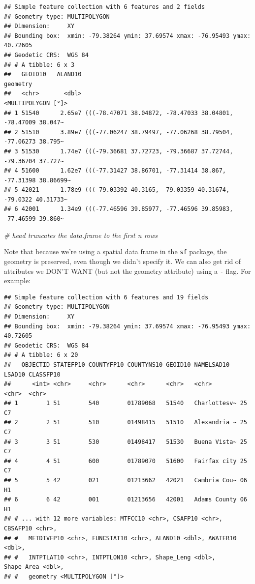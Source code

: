 \documentclass[]{article}
\newenvironment{Shaded}{\begin{snugshade}}{\end{snugshade}}
\newcommand{\CommentTok}[1]{\textcolor[rgb]{0.56,0.35,0.01}{\textit{#1}}}
\begin{document}
\begin{verbatim}
## Simple feature collection with 6 features and 2 fields
## Geometry type: MULTIPOLYGON
## Dimension:     XY
## Bounding box:  xmin: -79.38264 ymin: 37.69574 xmax: -76.95493 ymax: 40.72605
## Geodetic CRS:  WGS 84
## # A tibble: 6 x 3
##   GEOID10   ALAND10                                                     geometry
##   <chr>       <dbl>                                           <MULTIPOLYGON [°]>
## 1 51540      2.65e7 (((-78.47071 38.04872, -78.47033 38.04801, -78.47009 38.047~
## 2 51510      3.89e7 (((-77.06247 38.79497, -77.06268 38.79504, -77.06273 38.795~
## 3 51530      1.74e7 (((-79.36681 37.72723, -79.36687 37.72744, -79.36704 37.727~
## 4 51600      1.62e7 (((-77.31427 38.86701, -77.31414 38.867, -77.31398 38.86699~
## 5 42021      1.78e9 (((-79.03392 40.3165, -79.03359 40.31674, -79.0322 40.31733~
## 6 42001      1.34e9 (((-77.46596 39.85977, -77.46596 39.85983, -77.46599 39.860~
\end{verbatim}

\begin{Shaded}
\begin{Highlighting}[]
\CommentTok{\# head truncates the data.frame to the first n rows}
\end{Highlighting}
\end{Shaded}

Note that because we're using a spatial data frame in the \texttt{sf}
package, the geometry is preserved, even though we didn't specify it. We
can also get rid of attributes we DON'T WANT (but not the geometry
attribute) using a \texttt{-} flag. For example:

\begin{verbatim}
## Simple feature collection with 6 features and 19 fields
## Geometry type: MULTIPOLYGON
## Dimension:     XY
## Bounding box:  xmin: -79.38264 ymin: 37.69574 xmax: -76.95493 ymax: 40.72605
## Geodetic CRS:  WGS 84
## # A tibble: 6 x 20
##   OBJECTID STATEFP10 COUNTYFP10 COUNTYNS10 GEOID10 NAMELSAD10   LSAD10 CLASSFP10
##      <int> <chr>     <chr>      <chr>      <chr>   <chr>        <chr>  <chr>    
## 1        1 51        540        01789068   51540   Charlottesv~ 25     C7       
## 2        2 51        510        01498415   51510   Alexandria ~ 25     C7       
## 3        3 51        530        01498417   51530   Buena Vista~ 25     C7       
## 4        4 51        600        01789070   51600   Fairfax city 25     C7       
## 5        5 42        021        01213662   42021   Cambria Cou~ 06     H1       
## 6        6 42        001        01213656   42001   Adams County 06     H1       
## # ... with 12 more variables: MTFCC10 <chr>, CSAFP10 <chr>, CBSAFP10 <chr>,
## #   METDIVFP10 <chr>, FUNCSTAT10 <chr>, ALAND10 <dbl>, AWATER10 <dbl>,
## #   INTPTLAT10 <chr>, INTPTLON10 <chr>, Shape_Leng <dbl>, Shape_Area <dbl>,
## #   geometry <MULTIPOLYGON [°]>
\end{verbatim}
\end{document}
